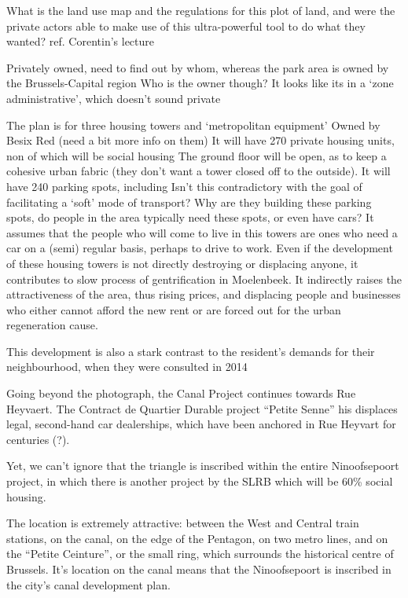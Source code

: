 \documentclass{article}[11pt]
\begin{document}
What is the land use map and the regulations for this plot of land, and were the private actors able to make use of this ultra-powerful tool to do what they wanted? ref. Corentin's lecture

Privately owned, need to find out by whom, whereas the park area is owned by the Brussels-Capital region
Who is the owner though? It looks like its in a `zone administrative', which doesn't sound private

The plan is for three housing towers and `metropolitan equipment' 
Owned by Besix Red (need a bit more info on them)
It will have 270 private housing units, non of which will be social housing
The ground floor will be open, as to keep a cohesive urban fabric (they don't want a tower closed off to the outside). 
It will have 240 parking spots, including 
Isn't this contradictory with the goal of facilitating a `soft' mode of transport? Why are they building these parking spots, do people in the area typically need these spots, or even have cars? It assumes that the people who will come to live in this towers are ones who need a car on a (semi) regular basis, perhaps to drive to work.
Even if the development of these housing towers is not directly destroying or displacing anyone, it contributes to slow process of gentrification in Moelenbeek. It indirectly raises the attractiveness of the area, thus rising prices, and displacing people and businesses who either cannot afford the new rent or are forced out for the urban regeneration cause. 

This development is also a stark contrast to the resident's demands for their neighbourhood, when they were consulted in 2014

Going beyond the photograph, the Canal Project continues towards Rue Heyvaert. The Contract de Quartier Durable project ``Petite Senne'' his displaces legal, second-hand car dealerships, which have been anchored in Rue Heyvart for centuries (?). 

Yet, we can't ignore that the triangle is inscribed within the entire Ninoofsepoort project, in which there is another project by the SLRB which will be 60\% social housing.

The location is extremely attractive: between the West and Central train stations, on the canal, on the edge of the Pentagon, on two metro lines, and on the ``Petite Ceinture'', or the small ring, which surrounds the historical centre of Brussels. It's location on the canal means that the Ninoofsepoort is inscribed in the city's canal development plan.
\end{document}
